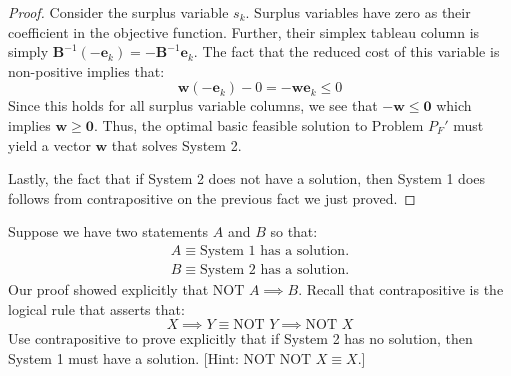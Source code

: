 \begin{proof}
Consider the surplus variable $s_k$. Surplus variables have zero as their coefficient in the objective function. Further, their simplex tableau column is simply $\mathbf{B}^{-1}(-\mathbf{e}_k) = -\mathbf{B}^{-1}\mathbf{e}_k$. The fact that the reduced cost of this variable is non-positive implies that:
\begin{equation}
\mathbf{w}(-\mathbf{e}_k) - 0 = -\mathbf{w}\mathbf{e}_k \leq 0
\end{equation}
Since this holds for all surplus variable columns, we see that $-\mathbf{w} \leq \mathbf{0}$ which implies $\mathbf{w} \geq \mathbf{0}$. Thus, the optimal basic feasible solution to Problem $P_F'$ must yield a vector $\mathbf{w}$ that solves System 2. 

Lastly, the fact that if System 2 does not have a solution, then System 1 does follows from contrapositive on the previous fact we just proved. 
\end{proof}
\begin{exercise} Suppose we have two statements $A$ and $B$ so that:
\begin{gather*}
A \equiv \text{System 1 has a solution.}\\
B \equiv \text{System 2 has a solution.}
\end{gather*}
Our proof showed explicitly that $\text{NOT } A \implies B$. Recall that contrapositive is the logical rule that asserts that:
\begin{equation}
X \implies Y \equiv \text{NOT }Y \implies \text{NOT }X
\end{equation}
Use contrapositive to prove explicitly that if System 2 has no solution, then System 1 must have a solution. [Hint: $\text{NOT }\text{NOT }X \equiv X$.]
\end{exercise}

